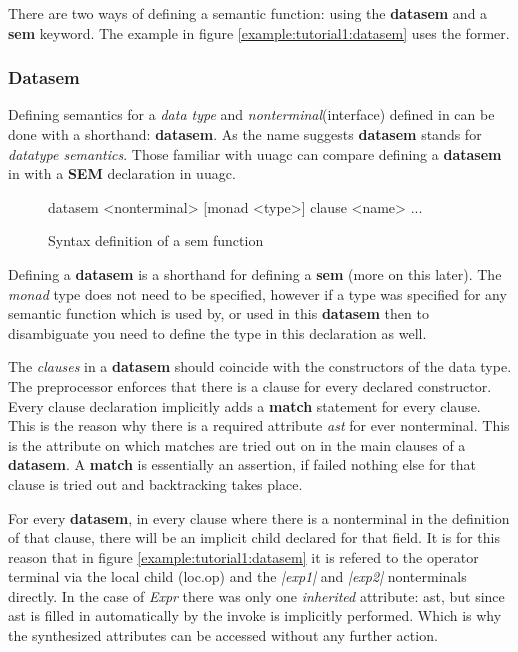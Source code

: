 There are two ways of defining a semantic function: using the \textbf{datasem} and a \textbf{sem} keyword. The example in figure \ref{example:tutorial1:datasem} uses the former.

\subsubsection{Datasem}
Defining semantics for a \emph{data type} and \emph{nonterminal}(interface) defined in \rcore can be done with a shorthand: \textbf{datasem}. As the name suggests \textbf{datasem} stands for \emph{datatype semantics}. Those familiar with uuagc can compare defining a \textbf{datasem} in \rcore with a \textbf{SEM} declaration in uuagc.

\begin{figure}[!h]
\begin{code}
datasem <nonterminal> [monad <type>]
    {clause <name>
        ...
    }
\end{code}
\caption{Syntax definition of a sem function}
\label{datasem:syntax}
\end{figure}

Defining a \textbf{datasem} is a shorthand for defining a \textbf{sem} (more on this later). The \emph{monad} type does not need to be specified, however if a type was specified for any semantic function which is used by, or used in this \textbf{datasem} then to disambiguate you need to define the type in this declaration as well.

The \emph{clauses} in a \textbf{datasem} should coincide with the constructors of the data type. The preprocessor enforces that there is a clause for every declared constructor. Every clause declaration implicitly adds a \textbf{match} statement for every clause. This is the reason why there is a required attribute \emph{ast} for ever nonterminal. This is the attribute on which matches are tried out on in the main clauses of a \textbf{datasem}. A \textbf{match} is essentially an assertion, if failed nothing else for that clause is tried out and backtracking takes place.

For every \textbf{datasem}, in every clause where there is a nonterminal in the definition of that clause, there will be an implicit child declared for that field. It is for this reason that in figure \ref{example:tutorial1:datasem} it is refered to the operator terminal via the local child (loc.op) and the \emph{|exp1|} and \emph{|exp2|} nonterminals directly. In the case of \emph{Expr} there was only one \emph{inherited} attribute: ast, but since ast is filled in automatically by \rcore the invoke is implicitly performed. Which is why the synthesized attributes can be accessed without any further action. 

